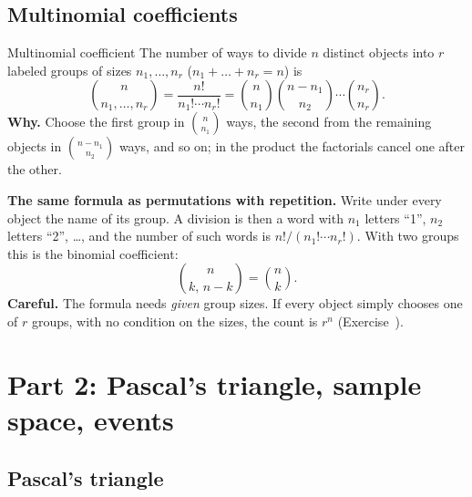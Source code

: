
\subsection*{Multinomial coefficients}

\begin{key}{Multinomial coefficient}
	The number of ways to divide $n$ distinct objects into $r$ labeled groups
	of sizes $n_1,\dots,n_r$ ($n_1+\dots+n_r=n$) is
	\[ \binom{n}{n_1,\dots,n_r}=\frac{n!}{n_1!\cdots n_r!}
		=\binom{n}{n_1}\binom{n-n_1}{n_2}\cdots\binom{n_r}{n_r}. \]
	\textbf{Why.} Choose the first group in $\binom n{n_1}$ ways, the second
	from the remaining objects in $\binom{n-n_1}{n_2}$ ways, and so on; in the
	product the factorials cancel one after the other.

	\textbf{The same formula as permutations with repetition.} Write under
	every object the name of its group. A division is then a word with $n_1$
	letters ``1'', $n_2$ letters ``2'', \dots, and the number of such words is
	$n!/(n_1!\cdots n_r!)$. With two groups this is the binomial coefficient:
	\[ \binom{n}{k,\,n-k}=\binom nk. \]
	\textbf{Careful.} The formula needs \emph{given} group sizes. If every
	object simply chooses one of $r$ groups, with no condition on the sizes,
	the count is $r^n$ (Exercise~).
\end{key}


\clearpage
\section{Part 2: Pascal's triangle, sample space, events}

\subsection*{Pascal's triangle}

